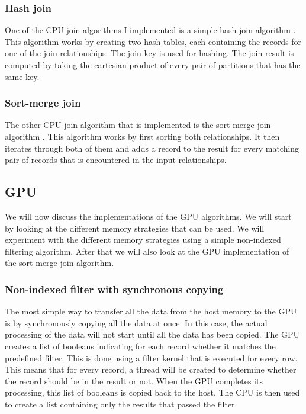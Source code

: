 \documentclass[a4paper,titlepage]{article}
\begin{document}
\subsubsection{Hash join}
One of the CPU join algorithms I implemented is a simple hash join algorithm \cite{dewitt1985}. This algorithm works by creating two hash tables, each containing the records for one of the join relationships. The join key is used for hashing. The join result is computed by taking the cartesian product of every pair of partitions that has the same key.

\subsubsection{Sort-merge join}
The other CPU join algorithm that is implemented is the sort-merge join algorithm \cite{blasgen1977}. This algorithm works by first sorting both relationships. It then iterates through both of them and adds a record to the result for every matching pair of records that is encountered in the input relationships.

\subsection{GPU}
\label{sec:gpu-implementation}
We will now discuss the implementations of the GPU algorithms. We will start by looking at the different memory strategies that can be used. We will experiment with the different memory strategies using a simple non-indexed filtering algorithm. After that we will also look at the GPU implementation of the sort-merge join algorithm.

\subsubsection{Non-indexed filter with synchronous copying}
The most simple way to transfer all the data from the host memory to the GPU is by synchronously copying all the data at once. In this case, the actual processing of the data will not start until all the data has been copied. The GPU creates a list of booleans indicating for each record whether it matches the predefined filter. This is done using a filter kernel that is executed for every row. This means that for every record, a thread will be created to determine whether the record should be in the result or not. When the GPU completes its processing, this list of booleans is copied back to the host. The CPU is then used to create a list containing only the results that passed the filter.
\end{document}
